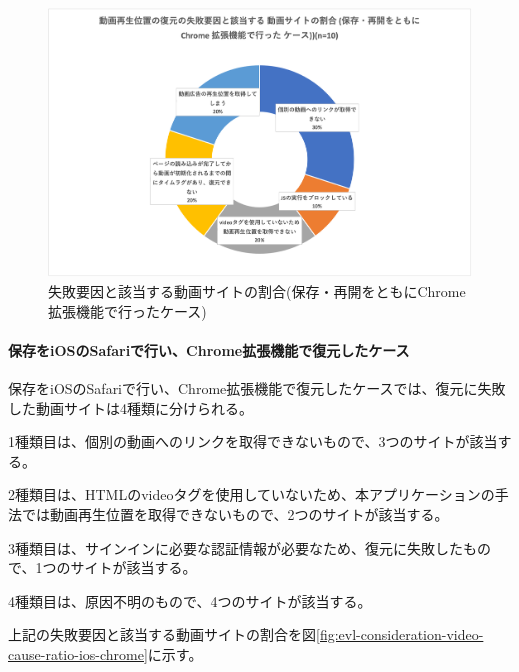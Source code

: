 \begin{figure}[htbp]
  \label{fig:evl-consideration-video-cause-ratio-chrome}
  \begin{center}
    \includegraphics[bb=0 0 692.44444444 440,width=15cm]{img/060_evaluation/consideration/video/cause-ratio-chrome.pdf}
  \end{center}
  \caption{失敗要因と該当する動画サイトの割合(保存・再開をともにChrome拡張機能で行ったケース)}
\end{figure}

\paragraph{保存をiOSのSafariで行い、Chrome拡張機能で復元したケース}
保存をiOSのSafariで行い、Chrome拡張機能で復元したケースでは、復元に失敗した動画サイトは4種類に分けられる。

1種類目は、個別の動画へのリンクを取得できないもので、3つのサイトが該当する。

2種類目は、HTMLのvideoタグを使用していないため、本アプリケーションの手法では動画再生位置を取得できないもので、2つのサイトが該当する。

3種類目は、サインインに必要な認証情報が必要なため、復元に失敗したもので、1つのサイトが該当する。

4種類目は、原因不明のもので、4つのサイトが該当する。

上記の失敗要因と該当する動画サイトの割合を図\ref{fig:evl-consideration-video-cause-ratio-ios-chrome}に示す。

